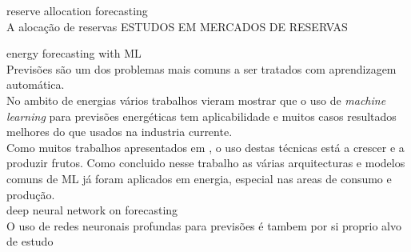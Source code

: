 reserve allocation forecasting \\
A alocação de reservas 
ESTUDOS EM MERCADOS DE RESERVAS \cite{Rassid2017}

energy forecasting with ML \\
Previsões são um dos problemas mais comuns a ser tratados com aprendizagem automática. \cite{} \\
No ambito de energias vários trabalhos vieram mostrar que o uso de \textit{machine learning} para previsões energéticas tem aplicabilidade \cite{Stassen} e muitos casos resultados melhores do que usados na industria currente. \cite{Ahmad2020} \cite{Antonopoulos2020} \\  
Como muitos trabalhos apresentados em \cite{Benti2023}, o uso destas técnicas está a crescer e a produzir frutos. Como concluido nesse trabalho as várias arquitecturas e modelos comuns de ML já foram aplicados em energia, especial nas areas de consumo e produção. \\



deep neural network on forecasting\\
O uso de redes neuronais profundas para previsões é tambem por si proprio alvo de estudo
\cite{miota2023}






